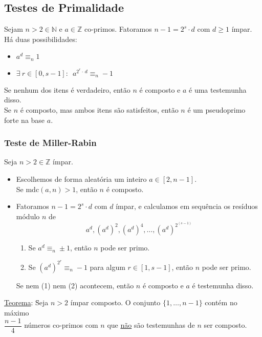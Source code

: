 \documentclass{article}
\begin{document}
\subsection{Testes de Primalidade}
Sejam $n > 2 \in \mathbb{N}$ e $a \in \mathbb{Z}$ co-primos. Fatoramos $n - 1 = 2^s \cdot d$ com $d \geq 1$ ímpar. Há duas possibilidades:
\begin{itemize}
  \item $a^d \equiv_n 1$
  \item $\exists\: r \in [0, s - 1]:\enspace a^{2^r \cdot\, d} \equiv_n -1$
\end{itemize}
Se nenhum dos itens é verdadeiro, então $n$ é composto e $a$ é uma testemunha disso. \\[5pt]
Se $n$ é composto, mas ambos itens são satisfeitos, então $n$ é um pseudoprimo forte na base $a$.

\subsubsection{Teste de Miller-Rabin}
Seja $n > 2 \in \mathbb{Z}$ ímpar.
\begin{itemize}
  \item Escolhemos de forma aleatória um inteiro $a \in [2, n - 1]$. \\[5pt]
        Se mdc$(a,n) > 1$, então $n$ é composto.
  \item Fatoramos $n - 1 = 2^s \cdot d$ com $d$ ímpar, e calculamos em sequência os resíduos módulo $n$ de \\
        \[ a^d, {\left( a^d \right)}^2, {\left( a^d \right)}^4, \hdots, {\left( a^d \right)}^{2^{(s - 1)}} \]
        \begin{enumerate}
          \item Se $a^d \equiv_n \pm 1$, então $n$ pode ser primo.
          \item Se ${\left( a^d \right)}^{2^r} \equiv_n -1$ para algum $r \in [1, s - 1]$, então $n$ pode ser primo.
        \end{enumerate}
        Se nem (1) nem (2) acontecem, então $n$ é composto e $a$ é testemunha disso.
\end{itemize}
\begin{tabbing}
  \uline{Teorema}: \= Seja $n > 2$ ímpar composto. O conjunto $\{ 1, \hdots, n-1\}$ contém no máximo \\[5pt]
  \> $\dfrac{n - 1}{4}$ números co-primos com $n$ que \uline{não} são testemunhas de $n$ ser composto.
\end{tabbing}
\end{document}
